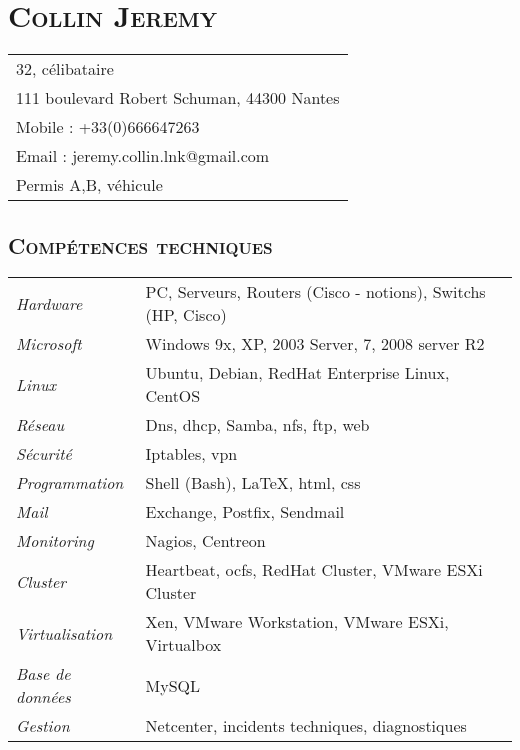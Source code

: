 \documentclass[a4paper,8pt]{article}
\newcommand{\hsection}[1]{\section*{\fontfamily{phv}\selectfont\textsc{#1}}}
\newcommand{\hsubsection}[1]{\subsection*{\fontfamily{phv}\selectfont\textsc{#1}}}
\begin{document}
\selectfont
\hsection{Collin Jeremy}
\begin{tabular}{p{16.5cm}}
\hline
32, célibataire\\
111 boulevard Robert Schuman, 44300 Nantes\\
Mobile : +33(0)666647263\\
Email : jeremy.collin.lnk@gmail.com\\
Permis A,B, véhicule\\
\end{tabular}

\hsubsection{Compétences techniques}
\begin{tabular}{P{3.5cm}|p{13cm}}
\textsl{Hardware}		& PC, Serveurs, Routers (Cisco - notions), Switchs (HP, Cisco)\\
\textsl{Microsoft}		& Windows 9x, XP, 2003 Server, 7, 2008 server R2\\
\textsl{Linux}			& Ubuntu, Debian, RedHat Enterprise Linux, CentOS\\
\textsl{Réseau}			& Dns, dhcp, Samba, nfs, ftp, web\\
\textsl{Sécurité}		& Iptables, vpn\\
\textsl{Programmation}	& Shell (Bash), \LaTeX, html, css\\
\textsl{Mail}			& Exchange, Postfix, Sendmail\\
\textsl{Monitoring}		& Nagios, Centreon\\
\textsl{Cluster}		& Heartbeat, ocfs, RedHat Cluster, VMware ESXi Cluster\\
\textsl{Virtualisation}	& Xen, VMware Workstation, VMware ESXi, Virtualbox\\
\textsl{Base de données}	& MySQL\\
\textsl{Gestion}		& Netcenter, incidents techniques, diagnostiques\\
\end{tabular}
\end{document}
